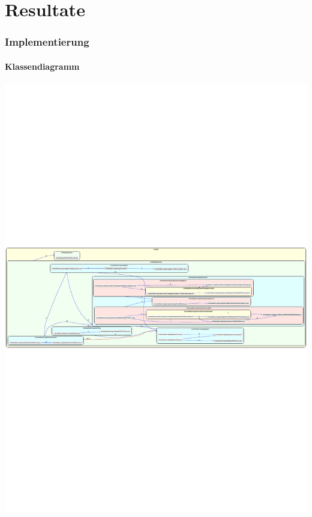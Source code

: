 \part{Resultate}
\section{Implementierung}
\subsection{Klassendiagramm}
\begin{minipage}[b]{0.49\linewidth}
\centering
\includegraphics[width=\textheight, angle=90]{img/ArchInternalDependencies-ch}
\end{minipage}
\hspace{0.5cm}
